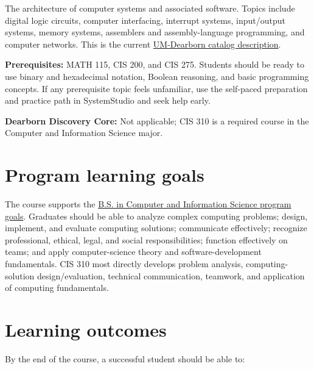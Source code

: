 \documentclass[10pt,letterpaper]{article}
\begin{document}
The architecture of computer systems and associated software. Topics include digital logic circuits, computer interfacing, interrupt systems, input/output systems, memory systems, assemblers and assembly-language programming, and computer networks. This is the current \href{https://catalog.umd.umich.edu/undergraduate/coursesaz/cis/}{UM-Dearborn catalog description}.

\textbf{Prerequisites:} MATH 115, CIS 200, and CIS 275. Students should be ready to use binary and hexadecimal notation, Boolean reasoning, and basic programming concepts. If any prerequisite topic feels unfamiliar, use the self-paced preparation and practice path in SystemStudio and seek help early.

\textbf{Dearborn Discovery Core:} Not applicable; CIS 310 is a required course in the Computer and Information Science major.

\section{Program learning goals}

The course supports the \href{https://umdearborn.edu/sites/default/files/unmanaged/pdf/provost/program-goals/cecs-computer-information-science-bs-goals.pdf}{B.S. in Computer and Information Science program goals}. Graduates should be able to analyze complex computing problems; design, implement, and evaluate computing solutions; communicate effectively; recognize professional, ethical, legal, and social responsibilities; function effectively on teams; and apply computer-science theory and software-development fundamentals. CIS 310 most directly develops problem analysis, computing-solution design/evaluation, technical communication, teamwork, and application of computing fundamentals.

\section{Learning outcomes}

By the end of the course, a successful student should be able to:
\end{document}
